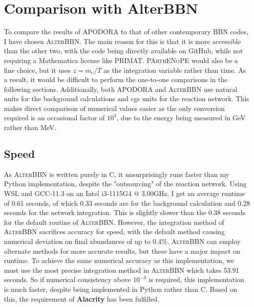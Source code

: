 \section{Comparison with AlterBBN}
\label{sec:Altercompare}
To compare the results of APODORA to that of other contemporary BBN codes, I have chosen \textsc{AlterBBN}. The main reason for this is that it is more accessible than the other two, with the code being directly available on GitHub, while not requiring a Mathematica license like PRIMAT. 
\textsc{PArthENoPE} would also be a fine choice, but it uses $z=m_e/T$ as the integration variable rather than time. As a result, it would be difficult to perform the one-to-one comparisons in the following sections.
Additionally, both APODORA and \textsc{AlterBBN} use natural units for the background calculations and cgs units for the reaction network. This makes direct comparison of numerical values easier as the only conversion required is an occasional factor of $10^3$, due to the energy being measured in GeV rather than MeV. 

\subsection{Speed}
As \textsc{AlterBBN} is written purely in C, it unsurprisingly runs faster than my Python implementation, despite the "outsourcing" of the reaction network. Using WSL and GCC-11.3 on an Intel i3-1115G4 @ 3.00GHz, I get an average runtime of 0.61 seconds, of which 0.33 seconds are for the background calculation and 0.28 seconds for the network integration. This is slightly slower than the 0.38 seconds for the default routine of \textsc{AlterBBN}. However, the integration method of \textsc{AlterBBN} sacrifices accuracy for speed, with the default method causing numerical deviation on final abundances of up to 0.4\%. \textsc{AlterBBN} can employ alternate methods for more accurate results, but these have a major impact on runtime. To achieve the same numerical accuracy as this implementation, we must use the most precise integration method in \textsc{AlterBBN} which takes 53.91 seconds. So if numerical consistency above $10^{-3}$ is required, this implementation is much faster, despite being implemented in Python rather than C.  Based on this, the requirement of \textbf{Alacrity} has been fulfilled.

